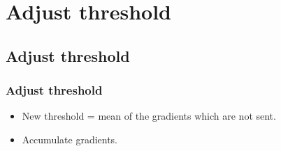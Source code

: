 \section{Adjust threshold}

\subsection{Adjust threshold}
\begin{frame}
    \frametitle{Adjust threshold}
	\begin{itemize}
		\item New threshold = mean of the gradients which are not sent. 
		\item Accumulate gradients.  
	\end{itemize}
\end{frame}




